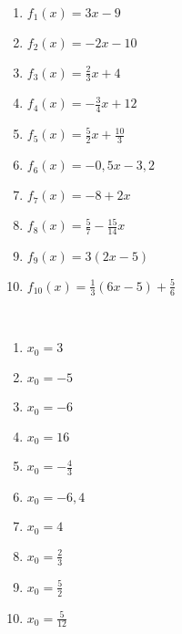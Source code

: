\begin{Exercise}[title={Bestimme die Nullstellen}, label=nullstellenA1]\ \\
	\begin{minipage}{0.5\textwidth}
		\begin{enumerate}[label=\alph*)]
			\item \(f_1(x)=3x-9\)
			\item \(f_2(x)=-2x-10\)
			\item \(f_3(x)=\frac{2}{3}x+4\)
			\item \(f_4(x)=-\frac{3}{4}x+12\)
			\item \(f_5(x)=\frac{5}{2}x+\frac{10}{3}\)
		\end{enumerate}
	\end{minipage}%
	\begin{minipage}{0.5\textwidth}
		\begin{enumerate}[label=\alph*)]
			\setcounter{enumi}{5}
			\item \(f_6(x)=-0,5x-3,2\)
			\item \(f_7(x)=-8+2x\)
			\item \(f_8(x)=\frac{5}{7}-\frac{15}{14}x\)
			\item \(f_9(x)=3(2x-5)\)
			\item \(f_{10}(x)=\frac{1}{3}\left(6x-5\right)+\frac{5}{6}\)
		\end{enumerate}
	\end{minipage}%
\end{Exercise}\vspace{0,5cm}
\begin{Answer}[ref=nullstellenA1]\\
	\begin{minipage}{0.5\textwidth}
		\begin{enumerate}[label=\alph*)]
			\item \(x_0=3\)
			\item \(x_0=-5\)
			\item \(x_0=-6\)
			\item \(x_0=16\)
			\item \(x_0=-\frac{4}{3}\)
		\end{enumerate}
	\end{minipage}%
	\begin{minipage}{0.5\textwidth}
		\begin{enumerate}[label=\alph*)]
			\setcounter{enumi}{5}
			\item \(x_0=-6,4\)
			\item \(x_0=4\)
			\item \(x_0=\frac{2}{3}\)
			\item \(x_0=\frac{5}{2}\)
			\item \(x_0=\frac{5}{12}\)
		\end{enumerate}
	\end{minipage}%
\end{Answer}